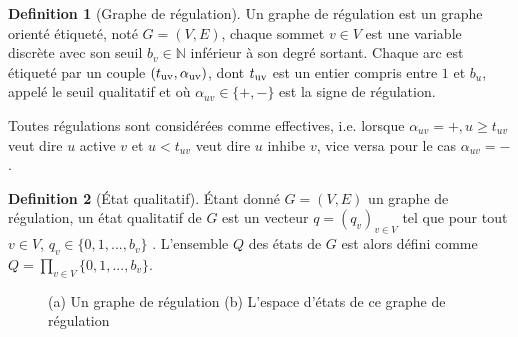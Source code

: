 \documentclass[11pt]{report}
\theoremstyle{definition}
\newtheorem{Def}{Definition}[chapter]
\begin{document}
\begin{Def}[Graphe de r\'egulation]
Un graphe de r\'egulation est un graphe orient\'e \'etiquet\'e, not\'e $G = (V, E)$, chaque sommet $v \in V$ est une variable discr\`ete avec son seuil $b_v\in \mathbb{N}$ inf\'erieur \`a son degr\'e sortant. Chaque arc est \'etiquet\'e par un couple $(t_{\rm{uv}}, \alpha_{\rm{uv}})$, dont $t_{\rm{uv}}$ est un entier compris entre $1$ et $b_u$, appel\'e le seuil qualitatif et o\`u $\alpha_{uv} \in \{+ ,-\}$ est la signe de r\'egulation. 
\end{Def}
Toutes r\'egulations sont consid\'er\'ees comme effectives, i.e. lorsque $\alpha_{uv}=+, u \geq t_{uv}$ veut dire $u$ active $v$ et $u < t_{uv}$ veut dire $u$ inhibe $v$, vice versa pour le cas $\alpha_{uv}=-$.
\begin{Def}[\'Etat qualitatif]
\'Etant donn\'e $G = (V, E)$ un graphe de r\'egulation, un \'etat qualitatif de $G$ est un vecteur $q=(q_v)_{v \in V}$ tel que pour tout $v \in V$, $q_v \in \{0, 1, ... , b_v\}$ . L'ensemble $Q$ des \'etats de $G$ est alors d\'efini comme $Q=\prod_{v \in V}\{0, 1, ..., b_v\}$.
\end{Def}
\begin{figure}[ht]
\begin{minipage}{0.45\linewidth}
\centering
{}
\caption{(a)}
\end{minipage}
\begin{minipage}{0.45\linewidth}
\centering
{}
\caption{(b)}
\end{minipage}
\caption{(a) Un graphe de r\'egulation (b) L'espace d'\'etats de ce graphe de r\'egulation}\label{figres}
\end{figure}
\end{document}
